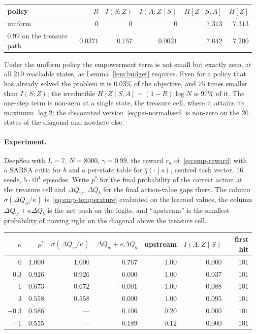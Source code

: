 \documentclass[11pt]{article}
\theoremstyle{remark}
\newcommand{\1}{\mathds{1}}
\newcommand{\Hf}[1]{H\!\left[#1\right]}
\newcommand{\fix}[1]{\textcolor{red!75!black}{#1}}
\begin{document}
\begin{center}
\begin{tabular}{lrrrrr}
\toprule
policy & $R$ & $I(S;Z)$ & $I(A;Z\mid S)$ & $\Hf{Z\mid S,A}$ & $\Hf{Z}$ \\
\midrule
uniform                      & $0$      & $0$     & $0$     & $7.313$ & $7.313$ \\
$0.99$ on the treasure path  & $0.0371$ & $0.157$ & $0.0021$ & $7.042$ & $7.200$ \\
\bottomrule
\end{tabular}
\end{center}

\noindent
Under the uniform policy the empowerment term is not small but exactly zero, at all $210$ reachable states, as Lemma~\ref{lem:budget} requires.
Even for a policy that has already solved the problem it is $0.03\%$ of the objective, and $75$ times smaller than $I(S;Z)$; the irreducible $\Hf{Z\mid S,A}=(1-R)\log N$ is $97\%$ of it.
The one-step term is non-zero at a single state, the treasure cell, where it attains its maximum $\log 2$; the discounted version~\eqref{eq:psi-normalised} is non-zero on the $20$ states of the diagonal and nowhere else.

\paragraph{\fix{Experiment.}}
\fix{DeepSea with $L=7$, $N=8000$, $\gamma=0.99$, the reward $r_\kappa$ of~\eqref{eq:emp-reward} with a SARSA critic for $b$ and a per-state table for $\hat q(\cdot\mid s)$, centred task vector, $16$ seeds, $5\cdot10^4$ episodes.
Write $p^\ast$ for the final probability of the correct action at the treasure cell and $\Delta Q_w$, $\Delta Q_b$ for the final action-value gaps there.
The column $\sigma(\Delta Q_w/\kappa)$ is~\eqref{eq:emp-temperature} evaluated on the learned values, the column $\Delta Q_w+\kappa\Delta Q_b$ is the net push on the logits, and ``upstream'' is the smallest probability of moving right on the diagonal above the treasure cell.}

\begin{center}
\fix{
\begin{tabular}{rrrrrrr}
\toprule
$\kappa$ & $p^\ast$ & $\sigma(\Delta Q_w/\kappa)$ & $\Delta Q_w+\kappa\Delta Q_b$ & upstream & $I(A;Z\mid S)$ & first hit \\
\midrule
$0$    & $1.000$ & $1.000$ & $0.767$  & $1.00$ & $0.000$ & $101$ \\
$0.3$  & $0.926$ & $0.926$ & $0.000$  & $1.00$ & $0.037$ & $101$ \\
$1$    & $0.673$ & $0.672$ & $-0.001$ & $1.00$ & $0.088$ & $101$ \\
$3$    & $0.558$ & $0.558$ & $0.000$  & $1.00$ & $0.095$ & $101$ \\
$-0.3$ & $0.586$ & ---     & $0.106$  & $0.20$ & $0.000$ & $101$ \\
$-1$   & $0.555$ & ---     & $0.189$  & $0.12$ & $0.000$ & $101$ \\
\bottomrule
\end{tabular}
}
\end{center}
\end{document}
